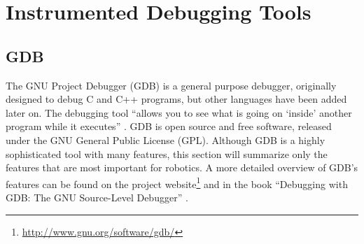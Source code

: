 

\section{Instrumented Debugging Tools}

\subsection{GDB}
The GNU Project Debugger (GDB) is a general purpose debugger, originally designed to debug C and C++ programs, but other languages have been added later on. The debugging tool ``allows you to see what is going on `inside' another program while it executes'' \cite{Stallman2002}. GDB is open source and free software, released under the GNU General Public License (GPL). Although GDB is a highly sophisticated tool with many features, this section will summarize only the features that are most important for robotics. A more detailed overview of GDB's features can be found on the project website\footnote{\url{http://www.gnu.org/software/gdb/}} and in the book ``Debugging with GDB: The GNU Source-Level Debugger'' \cite{Stallman2002}.

